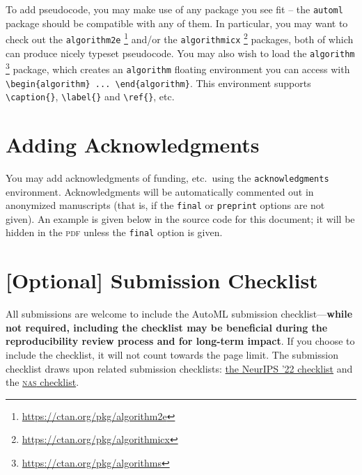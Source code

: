 \documentclass[11pt]{article}
\begin{document}
To add pseudocode, you may make use of any package you see fit -- the
\texttt{automl} package should be compatible with any of them. In particular,
you may want to check out the \texttt{algorithm2e}%
%
\footnote{\url{https://ctan.org/pkg/algorithm2e}}
%
and/or the \texttt{algorithmicx}%
%
\footnote{\url{https://ctan.org/pkg/algorithmicx}}
%
packages, both of which can produce nicely typeset pseudocode. You may also wish
to load the \texttt{algorithm}%
%
\footnote{\url{https://ctan.org/pkg/algorithms}}
%
package, which creates an \texttt{algorithm} floating environment you can access
with \verb|\begin{algorithm} ... \end{algorithm}|. This environment supports
\verb|\caption{}|, \verb|\label{}| and \verb|\ref{}|, etc.

\section{Adding Acknowledgments}

You may add acknowledgments of funding, etc.\ using the \texttt{acknowledgments}
environment. Acknowledgments will be automatically commented out in anonymized
manuscripts (that is, if the \texttt{final} or \texttt{preprint} options are not
given). An example is given below in the source code for this document; it will
be hidden in the \textsc{pdf} unless the \texttt{final} option is given.

\section{[Optional] Submission Checklist}
All submissions are welcome to include the AutoML submission checklist—\textbf{while not required, including the checklist may be beneficial during the reproducibility review process and for long-term impact}. If you choose to include the checklist, it will not count towards the page limit. The submission
checklist draws upon related submission checklists:
%
\href{https://neurips.cc/Conferences/2022/PaperInformation/PaperChecklist}
     {the NeurIPS '22 checklist}
%
and the
\href{https://www.automl.org/wp-content/uploads/NAS/NAS_checklist.pdf}
     {\textsc{nas} checklist}.
%
\end{document}
